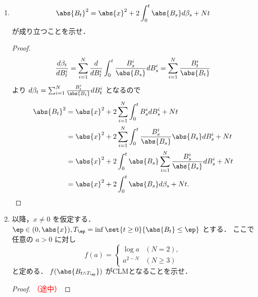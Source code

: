 \documentclass{jsarticle}
\begin{document}
\begin{enumerate}
\begin{proof}
        したがって $\beta$ は $(\clf_t)$-CLMである\nazo．
        ここで
        \begin{align}
            \gen{\beta, \beta}_t
            &= \gen{\sum_{i=1}^{N}\int_{0}^{\cdot}\frac{B_{s}^{i}}{\abs{B_s}}dB_s^i, \sum_{i=1}^{N}\int_{0}^{\cdot}\frac{B_{s}^{i}}{\abs{B_s}}dB_s^i}_t \\
            &= \sum_{i=1}^{N}\gen{\int_{0}^{\cdot}\frac{B_{s}^{i}}{\abs{B_s}}dB_s^i, \int_{0}^{\cdot}\frac{B_{s}^{i}}{\abs{B_s}}dB_s^i}_t \\
            &= \sum_{i=1}^{N}\int_{0}^{t}\frac{(B_{s}^{i})^2}{\abs{B_s}^2}ds
            = \int_{0}^{t}\frac{\abs{B_s}^2}{\abs{B_s}^2}ds = t
        \end{align}
        が成り立つことより，$\beta$ は0スタートの $(\clf_t)$-BMである．
    \end{proof}
    
    \item
    $$
    \abs{B_t}^2
    = \abs{x}^2+2\int_0^t \abs{B_s}d\beta_s+Nt
    $$
    が成り立つことを示せ．
    \begin{proof}
        \begin{align}
            \frac{d\beta_t}{dB_t^i}
            = \sum_{i=1}^{N}\frac{d}{dB_t^i}\int_0^t\frac{B_{s}^{i}}{\abs{B_s}}dB_s^i
            = \sum_{i=1}^{N}\frac{B_{t}^{i}}{\abs{B_t}}
        \end{align}
        より $d\beta_t=\sum_{i=1}^{N}\frac{B_{t}^{i}}{\abs{B_t}}dB_t^i$ となるので
        \begin{align}
            \abs{B_t}^2
            &= \abs{x}^2
            + 2\sum_{i=1}^{N}\int_{0}^{t}B_s^i dB_s^i
            + Nt \\
            &= \abs{x}^2
            + 2\sum_{i=1}^{N}\int_{0}^{t}\frac{B_{s}^{i}}{\abs{B_s}}\abs{B_s}dB_s^i
            + Nt \\
            &= \abs{x}^2
            + 2\int_{0}^{t}\abs{B_s}\sum_{i=1}^{N}\frac{B_{s}^{i}}{\abs{B_s}}dB_s^i
            + Nt \\
            &= \abs{x}^2
            + 2\int_{0}^{t}\abs{B_s}d\beta_s
            + Nt.
        \end{align}
    \end{proof}
    
    \item
    以降，$x\neq0$ を仮定する．
    $\ep\in(0,\abs{x}),T_{\ep}=\inf\set{t\ge0}{\abs{B_t}\le\ep}$ とする．
    ここで任意の $a>0$ に対し
    $$
    f(a)=
    \begin{cases}
        \log a & (N=2), \\
        a^{2-N} & (N\ge3)
    \end{cases}
    $$
    と定める．
    $f(\abs{B_{t\wedge T_{\ep}}})$ がCLMとなることを示せ．
    \begin{proof}\textcolor{red}{（途中）}
        

\end{proof}
\end{enumerate}
\end{document}
